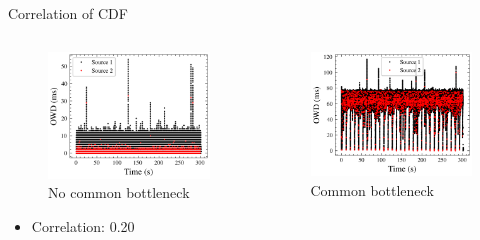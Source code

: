 \documentclass[presentation]{beamer}
\begin{document}
\begin{frame}[allowframebreaks,label=]{Correlation of CDF}
\begin{columns}
\begin{column}{.56\columnwidth}
\begin{figure}[htbp]
\centering
\includegraphics[width=.9\linewidth]{figures/presentation/owd-time-nocommon.png}
\caption{\label{fig:org40086b4}No common bottleneck}
\end{figure}

\begin{itemize}
\item Correlation: 0.20
\end{itemize}
\end{column}
\begin{column}{.56\columnwidth}
\begin{figure}[htbp]
\centering
\includegraphics[width=.9\linewidth]{figures/presentation/owd-time-common.png}
\caption{\label{fig:orgaa82937}Common bottleneck}
\end{figure}


\end{column}
\end{columns}
\end{frame}
\end{document}
